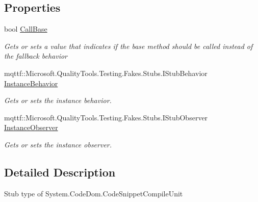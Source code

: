 \subsection*{Properties}
\begin{DoxyCompactItemize}
\item 
bool \hyperlink{class_system_1_1_code_dom_1_1_fakes_1_1_stub_code_snippet_compile_unit_a1aa8f4a7cf55b4f51671e967f2f11ca2}{Call\-Base}
\begin{DoxyCompactList}\small\item\em Gets or sets a value that indicates if the base method should be called instead of the fallback behavior\end{DoxyCompactList}\item 
mqttf\-::\-Microsoft.\-Quality\-Tools.\-Testing.\-Fakes.\-Stubs.\-I\-Stub\-Behavior \hyperlink{class_system_1_1_code_dom_1_1_fakes_1_1_stub_code_snippet_compile_unit_a3c892d6449819fe0b2fe5078170993d1}{Instance\-Behavior}
\begin{DoxyCompactList}\small\item\em Gets or sets the instance behavior.\end{DoxyCompactList}\item 
mqttf\-::\-Microsoft.\-Quality\-Tools.\-Testing.\-Fakes.\-Stubs.\-I\-Stub\-Observer \hyperlink{class_system_1_1_code_dom_1_1_fakes_1_1_stub_code_snippet_compile_unit_aeaa9a94db004229c99e45412fdcff0d7}{Instance\-Observer}
\begin{DoxyCompactList}\small\item\em Gets or sets the instance observer.\end{DoxyCompactList}\end{DoxyCompactItemize}


\subsection{Detailed Description}
Stub type of System.\-Code\-Dom.\-Code\-Snippet\-Compile\-Unit



